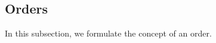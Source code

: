 





\subsection{Orders}
\label{subsec:order}
In this subsection, we formulate the concept of an order.

